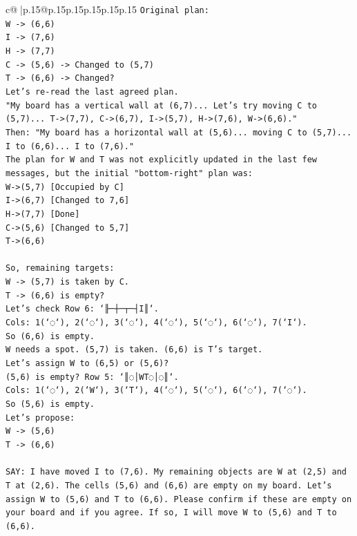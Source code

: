 \documentclass{article}
\begin{document}
{\begin{supertabular}{c@{$\;$}|p{.15\linewidth}@{}p{.15\linewidth}p{.15\linewidth}p{.15\linewidth}p{.15\linewidth}p{.15\linewidth}}
{{{\texttt{Original plan:} \\
\texttt{W {-}> (6,6)} \\
\texttt{I {-}> (7,6)} \\
\texttt{H {-}> (7,7)} \\
\texttt{C {-}> (5,6) {-}> Changed to (5,7)} \\
\texttt{T {-}> (6,6) {-}> Changed?} \\
\texttt{Let's re{-}read the last agreed plan.} \\
\texttt{"My board has a vertical wall at (6,7)... Let's try moving C to (5,7)... T{-}>(7,7), C{-}>(6,7), I{-}>(5,7), H{-}>(7,6), W{-}>(6,6)."} \\
\texttt{Then: "My board has a horizontal wall at (5,6)... moving C to (5,7)... I to (6,6)... I to (7,6)."} \\
\texttt{The plan for W and T was not explicitly updated in the last few messages, but the initial "bottom{-}right" plan was:} \\
\texttt{W{-}>(5,7) {[}Occupied by C{]}} \\
\texttt{I{-}>(6,7) {[}Changed to 7,6{]}} \\
\texttt{H{-}>(7,7) {[}Done{]}} \\
\texttt{C{-}>(5,6) {[}Changed to 5,7{]}} \\
\texttt{T{-}>(6,6)} \\
\\ 
\texttt{So, remaining targets:} \\
\texttt{W {-}> (5,7) is taken by C.} \\
\texttt{T {-}> (6,6) is empty?} \\
\texttt{Let's check Row 6: `╟─┼─┬─┤I║`.} \\
\texttt{Cols: 1(`◌`), 2(`◌`), 3(`◌`), 4(`◌`), 5(`◌`), 6(`◌`), 7(`I`).} \\
\texttt{So (6,6) is empty.} \\
\texttt{W needs a spot. (5,7) is taken. (6,6) is T's target.} \\
\texttt{Let's assign W to (6,5) or (5,6)?} \\
\texttt{(5,6) is empty? Row 5: `║◌│WT◌│◌║`.} \\
\texttt{Cols: 1(`◌`), 2(`W`), 3(`T`), 4(`◌`), 5(`◌`), 6(`◌`), 7(`◌`).} \\
\texttt{So (5,6) is empty.} \\
\texttt{Let's propose:} \\
\texttt{W {-}> (5,6)} \\
\texttt{T {-}> (6,6)} \\
\\ 
\texttt{SAY: I have moved I to (7,6). My remaining objects are W at (2,5) and T at (2,6). The cells (5,6) and (6,6) are empty on my board. Let's assign W to (5,6) and T to (6,6). Please confirm if these are empty on your board and if you agree. If so, I will move W to (5,6) and T to (6,6).} \\
            }
        }
    }
     \\ \\


\end{supertabular}}
\end{document}
